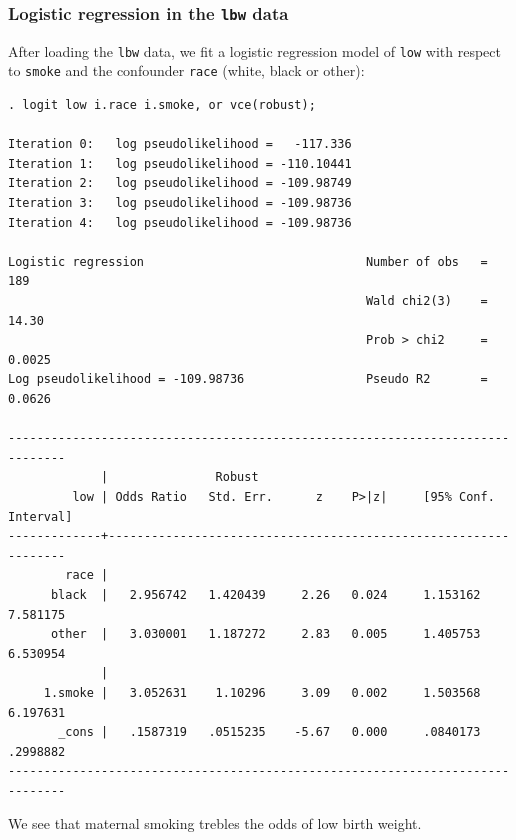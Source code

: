 \documentclass[11pt]{beamer}
\begin{document}
\begin{frame}[fragile]
\frametitle{Logistic regression in the \texttt{lbw} data}

After loading the \texttt{lbw} data, we fit a logistic regression model of \texttt{low}
with respect to \texttt{smoke} and the confounder \texttt{race}
(white, black or other):

\tiny
\begin{verbatim}
. logit low i.race i.smoke, or vce(robust);

Iteration 0:   log pseudolikelihood =   -117.336  
Iteration 1:   log pseudolikelihood = -110.10441  
Iteration 2:   log pseudolikelihood = -109.98749  
Iteration 3:   log pseudolikelihood = -109.98736  
Iteration 4:   log pseudolikelihood = -109.98736  

Logistic regression                               Number of obs   =        189
                                                  Wald chi2(3)    =      14.30
                                                  Prob > chi2     =     0.0025
Log pseudolikelihood = -109.98736                 Pseudo R2       =     0.0626

------------------------------------------------------------------------------
             |               Robust
         low | Odds Ratio   Std. Err.      z    P>|z|     [95% Conf. Interval]
-------------+----------------------------------------------------------------
        race |
      black  |   2.956742   1.420439     2.26   0.024     1.153162    7.581175
      other  |   3.030001   1.187272     2.83   0.005     1.405753    6.530954
             |
     1.smoke |   3.052631    1.10296     3.09   0.002     1.503568    6.197631
       _cons |   .1587319   .0515235    -5.67   0.000     .0840173    .2998882
------------------------------------------------------------------------------
\end{verbatim}
\normalsize

We see that maternal smoking trebles the odds of low birth weight.

\end{frame}
\end{document}
